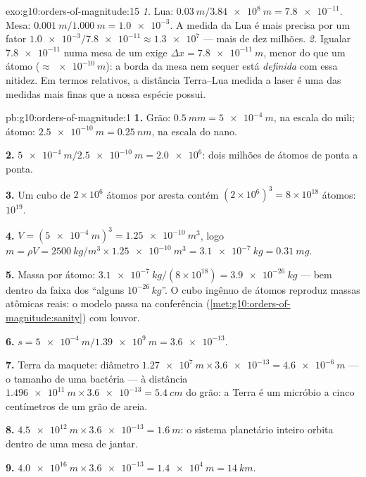 \begin{solution}{exo:g10:orders-of-magnitude:15}
\emph{1.} Lua: $\qty{0.03}{m}/\qty{3.84e8}{m} = \num{7.8e-11}$. Mesa:
$\qty{0.001}{m}/\qty{1.000}{m} = \num{1.0e-3}$. A medida da Lua é mais
precisa por um fator $\num{1.0e-3}/\num{7.8e-11} \approx \num{1.3e7}$
--- mais de dez milhões.
\emph{2.} Igualar $\num{7.8e-11}$ numa mesa de um  exige
$\Delta x = \qty{7.8e-11}{m}$, menor do que um átomo
($\approx \qty{e-10}{m}$): a borda da mesa nem sequer está
\emph{definida} com essa nitidez. Em termos relativos, a distância
Terra--Lua medida a laser é uma das medidas mais finas que a nossa
espécie possui.
\end{solution}

\begin{solution}{pb:g10:orders-of-magnitude:1}
\textbf{1.} Grão: $\qty{0.5}{mm} = \qty{5e-4}{m}$, na escala do mili;
átomo: $\qty{2.5e-10}{m} = \qty{0.25}{nm}$, na escala do nano.

\textbf{2.} $\qty{5e-4}{m}/\qty{2.5e-10}{m} = \num{2.0e6}$: dois milhões
de átomos de ponta a ponta.

\textbf{3.} Um cubo de $2 \times 10^{6}$ átomos por aresta contém
$(2\times10^{6})^{3} = 8 \times 10^{18}$ átomos: 
$10^{19}$.

\textbf{4.} $V = (\qty{5e-4}{m})^{3} = \qty{1.25e-10}{m^3}$, logo
$m = \rho V = \qty{2500}{kg/m^3} \times \qty{1.25e-10}{m^3}
= \qty{3.1e-7}{kg} = \qty{0.31}{mg}$.

\textbf{5.} Massa por átomo:
$\qty{3.1e-7}{kg}/(8\times10^{18}) = \qty{3.9e-26}{kg}$ --- bem dentro
da faixa dos ``alguns $10^{-26}\,\unit{kg}$''. O cubo ingênuo de átomos
reproduz massas atômicas reais: o modelo passa na conferência
(\cref{met:g10:orders-of-magnitude:sanity}) com louvor.

\textbf{6.} $s = \qty{5e-4}{m}/\qty{1.39e9}{m} = \num{3.6e-13}$.

\textbf{7.} Terra da maquete: diâmetro
$\qty{1.27e7}{m} \times \num{3.6e-13} = \qty{4.6e-6}{m}$ --- o tamanho
de uma bactéria --- à distância
$\qty{1.496e11}{m} \times \num{3.6e-13} = \qty{5.4}{cm}$ do grão: a
Terra é um micróbio a cinco centímetros de um grão de areia.

\textbf{8.} $\qty{4.5e12}{m} \times \num{3.6e-13} = \qty{1.6}{m}$: o
sistema planetário inteiro orbita dentro de uma mesa de jantar.

\textbf{9.} $\qty{4.0e16}{m} \times \num{3.6e-13} = \qty{1.4e4}{m}
= \qty{14}{km}$.


\end{solution}
